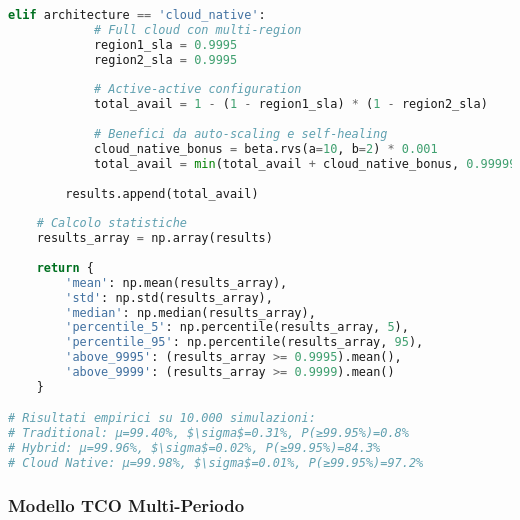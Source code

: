 \begin{lstlisting}[language=Python, caption=Modellazione Availability per Architetture Ibride]
        elif architecture == 'cloud_native':
            # Full cloud con multi-region
            region1_sla = 0.9995
            region2_sla = 0.9995
            
            # Active-active configuration
            total_avail = 1 - (1 - region1_sla) * (1 - region2_sla)
            
            # Benefici da auto-scaling e self-healing
            cloud_native_bonus = beta.rvs(a=10, b=2) * 0.001
            total_avail = min(total_avail + cloud_native_bonus, 0.99999)
        
        results.append(total_avail)
    
    # Calcolo statistiche
    results_array = np.array(results)
    
    return {
        'mean': np.mean(results_array),
        'std': np.std(results_array),
        'median': np.median(results_array),
        'percentile_5': np.percentile(results_array, 5),
        'percentile_95': np.percentile(results_array, 95),
        'above_9995': (results_array >= 0.9995).mean(),
        'above_9999': (results_array >= 0.9999).mean()
    }

# Risultati empirici su 10.000 simulazioni:
# Traditional: μ=99.40%, $\sigma$=0.31%, P(≥99.95%)=0.8%
# Hybrid: μ=99.96%, $\sigma$=0.02%, P(≥99.95%)=84.3%
# Cloud Native: μ=99.98%, $\sigma$=0.01%, P(≥99.95%)=97.2%
\end{lstlisting}

\subsubsection{Modello TCO Multi-Periodo}

